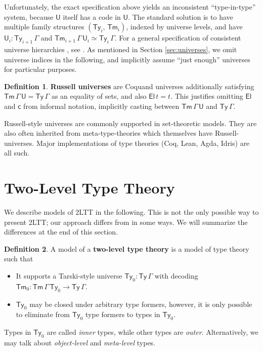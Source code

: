 \documentclass[12pt,a4paper,twoside,openany]{book}
\theoremstyle{remark}
\theoremstyle{definition}
\newtheorem{mydefinition}{Definition}
\newcommand{\ms}[1]{\mathsf{#1}}
\newcommand{\Tm}{\mathsf{Tm}}
\newcommand{\Ty}{\mathsf{Ty}}
\newcommand{\U}{\mathsf{U}}
\newcommand{\El}{\mathsf{El}}
\begin{document}
Unfortunately, the exact specification above yields an inconsistent
``type-in-type'' system, because $\U$ itself has a code in $\U$. The standard
solution is to have multiple family structures $(\Ty_i,\,\Tm_i)$, indexed by
universe levels, and have $\U_i : \Ty_{i + 1}\,\Gamma$ and
$\Tm_{i+1}\,\Gamma\,\U_i \simeq \Ty_i\,\Gamma$. For a general specification of
consistent universe hierarchies , see \cite{kovacs2021generalized}. As mentioned in Section
\ref{sec:universes}, we omit universe indices in the following, and implicitly
assume ``just enough'' universes for particular purposes.

\begin{mydefinition}
\textbf{Russell universes} are Coquand universes additionally satisfying
$\Tm\,\Gamma\,\U = \Ty\,\Gamma$ as an equality of sets, and also $\ms{El}\,t =
t$. This justifies omitting $\El$ and $\ms{c}$ from informal notation,
implicitly casting between $\Tm\,\Gamma\,\U$ and $\Ty\,\Gamma$.
\end{mydefinition}
Russell-style universes are commonly supported in set-theoretic models. They are
also often inherited from meta-type-theories which themselves have
Russell-universes. Major implementations of type theories (Coq, Lean, Agda,
Idris) are all such.


\section{Two-Level Type Theory}

We describe models of 2LTT in the following. This is not the only possible way
to present 2LTT; our approach differs from \cite{twolevel} in some ways. We will summarize
the differences at the end of this section.

\begin{mydefinition}
A model of a \textbf{two-level type theory} is a model of type theory such that
\begin{itemize}
  \item It supports a Tarski-style universe $\Ty_0 : \Ty\,\Gamma$ with decoding $\Tm_0 :
    \Tm\,\Gamma\,\Ty_0 \to \Ty\,\Gamma$.
  \item $\Ty_0$ may be closed under arbitrary type formers, however, it is only possible
    to eliminate from $\Ty_0$ type formers to types in $\Ty_0$.
\end{itemize}
Types in $\Ty_0$ are called \emph{inner} types, while other types are \emph{outer}. Alternatively,
we may talk about \emph{object-level} and \emph{meta-level} types.
\end{mydefinition}
\end{document}

